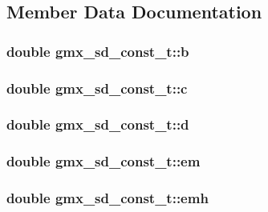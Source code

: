 \subsection{\-Member \-Data \-Documentation}
\hypertarget{structgmx__sd__const__t_a6e097df68d8603a7c83f6e13b1d3ecc5}{
\subsubsection[{b}]{\setlength{\rightskip}{0pt plus 5cm}double {\bf gmx\-\_\-sd\-\_\-const\-\_\-t\-::b}}}\label{structgmx__sd__const__t_a6e097df68d8603a7c83f6e13b1d3ecc5}
\hypertarget{structgmx__sd__const__t_a5f0b22f68a4a40fe3f423ba69b72e876}{
\subsubsection[{c}]{\setlength{\rightskip}{0pt plus 5cm}double {\bf gmx\-\_\-sd\-\_\-const\-\_\-t\-::c}}}\label{structgmx__sd__const__t_a5f0b22f68a4a40fe3f423ba69b72e876}
\hypertarget{structgmx__sd__const__t_a9fd17acbbefd6557203d05527e388676}{
\subsubsection[{d}]{\setlength{\rightskip}{0pt plus 5cm}double {\bf gmx\-\_\-sd\-\_\-const\-\_\-t\-::d}}}\label{structgmx__sd__const__t_a9fd17acbbefd6557203d05527e388676}
\hypertarget{structgmx__sd__const__t_aa9872f03aa048a2eb136c2fd09f75fea}{
\subsubsection[{em}]{\setlength{\rightskip}{0pt plus 5cm}double {\bf gmx\-\_\-sd\-\_\-const\-\_\-t\-::em}}}\label{structgmx__sd__const__t_aa9872f03aa048a2eb136c2fd09f75fea}
\hypertarget{structgmx__sd__const__t_aa83e1586e0ad32b60a0727f49516891e}{
\subsubsection[{emh}]{\setlength{\rightskip}{0pt plus 5cm}double {\bf gmx\-\_\-sd\-\_\-const\-\_\-t\-::emh}}}\label{structgmx__sd__const__t_aa83e1586e0ad32b60a0727f49516891e}
